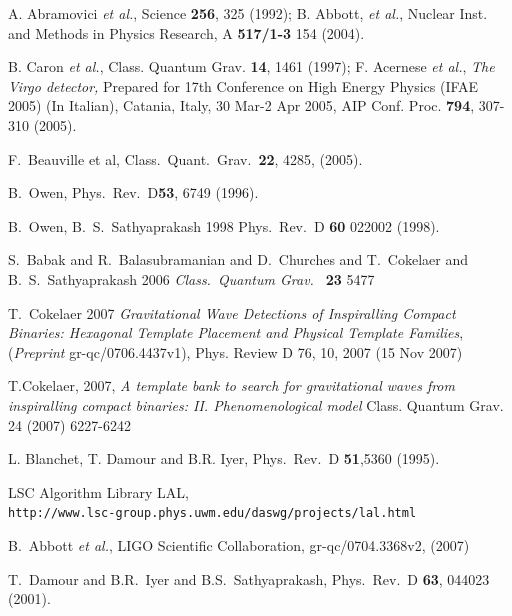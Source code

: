 \documentclass[a4paper,10pt]{article}
\begin{document}
\begin{thebibliography}{99}
A. Abramovici {\it et al.}, Science {\bf 256}, 325 (1992);
B. Abbott, {\it et al.}, Nuclear Inst. and Methods in Physics 
Research, A {\bf 517/1-3} 154 (2004).

B. Caron {\it et al.}, Class. Quantum Grav. {\bf 14}, 1461 (1997);
F. Acernese {\it et al.}, {\em The Virgo detector,} 
Prepared for 17th Conference on High Energy Physics (IFAE 2005) (In Italian), 
Catania, Italy, 30 Mar-2 Apr 2005,  AIP Conf. Proc. {\bf 794}, 307-310 (2005).

F.~Beauville et al, Class.\ Quant.\ Grav.\ \textbf{22}, 4285, (2005).

B.~Owen, Phys.\ Rev.\  D\textbf {53}, 6749 (1996).

 B.~Owen, B.~S.~Sathyaprakash 1998 Phys.\ Rev.\ 
D \textbf{60} 022002 (1998).

S.~Babak and R.~Balasubramanian and D.~Churches and T.~Cokelaer and B.~S.~Sathyaprakash 2006 \textit{Class.\ Quantum Grav.\ }
\textbf{23} 5477

 T.~Cokelaer 2007 \textit{Gravitational Wave Detections of Inspiralling Compact Binaries: Hexagonal Template Placement and Physical Template Families}, (\textit{Preprint} gr-qc/0706.4437v1), Phys. Review D 76, 10, 2007 (15 Nov 2007) 


 T.Cokelaer, 2007, \textit{A template bank to search for gravitational waves from inspiralling compact binaries: II. Phenomenological model}
Class. Quantum Grav. 24 (2007) 6227-6242 


 L. Blanchet, T. Damour and B.R. Iyer, Phys.\ Rev.\ D {\bf 51},5360 (1995).

 LSC Algorithm Library LAL,\\
{\tt http://www.lsc-group.phys.uwm.edu/daswg/\-projects/lal.html}

B.~Abbott {\it et al.}, LIGO Scientific Collaboration, gr-qc/0704.3368v2,
(2007)

T.~Damour and B.R.~Iyer and B.S.~Sathyaprakash, Phys.\ Rev.\ D
\textbf{63}, 044023 (2001).

\end{thebibliography}


\label{theend}
\end{document}
